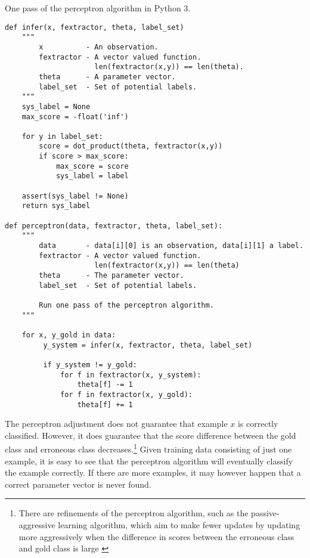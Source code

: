 \begin{algorithm}[!p]
\begin{center}
\caption{One pass of the perceptron algorithm in Python 3.}\label{perceptron-algorithm}
\begin{lstlisting}[linewidth=\textwidth]
def infer(x, fextractor, theta, label_set)
    """
        x          - An observation.
        fextractor - A vector valued function. 
                     len(fextractor(x,y)) == len(theta). 
        theta      - A parameter vector.
        label_set  - Set of potential labels. 
    """
    sys_label = None
    max_score = -float('inf')
 
    for y in label_set:
        score = dot_product(theta, fextractor(x,y))
        if score > max_score:
            max_score = score
            sys_label = label

    assert(sys_label != None)
    return sys_label

def perceptron(data, fextractor, theta, label_set): 
    """
        data       - data[i][0] is an observation, data[i][1] a label.
        fextractor - A vector valued function. 
                     len(fextractor(x,y)) == len(theta) 
        theta      - The parameter vector.
        label_set  - Set of potential labels. 

        Run one pass of the perceptron algorithm.
    """

    for x, y_gold in data:
         y_system = infer(x, fextractor, theta, label_set)
         
         if y_system != y_gold:
             for f in fextractor(x, y_system):
                 theta[f] -= 1
             for f in fextractor(x, y_gold):
                 theta[f] += 1
\end{lstlisting}
\end{center}
\end{algorithm}

The perceptron adjustment does not guarantee that example $x$ is
correctly classified. However, it does guarantee that the score
difference between the gold class and erroneous class decreases.\footnote{There are refinements of the perceptron algorithm, such as the passive-aggressive learning algorithm, which aim to make fewer updates by updating more aggressively when the difference in scores between the erroneous class and gold class is large \citep{Crammer2006}} Given
training data consisting of just one example, it is easy to see that
the perceptron algorithm will eventually classify the example
correctly. If there are more examples, it may however happen that a
correct parameter vector is never found.

